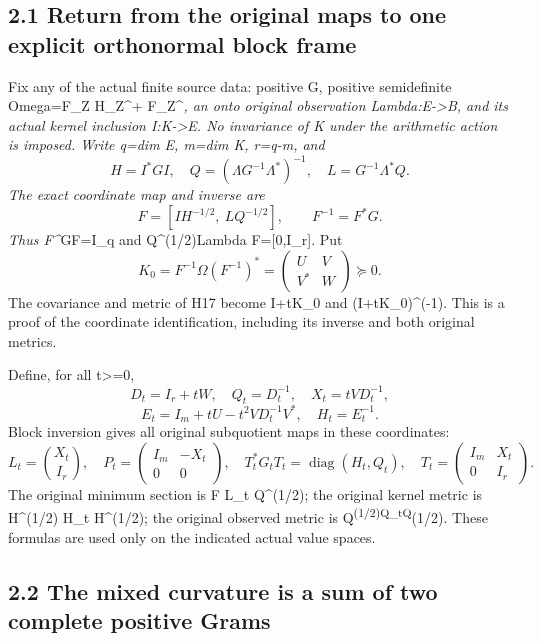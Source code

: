 \subsection{2.1 Return from the original maps to one explicit orthonormal block frame}\label{return-from-the-original-maps-to-one-explicit-orthonormal-block-frame}

Fix any of the actual finite source data: positive G, positive semidefinite Omega=F\_Z H\_Z\^{}+ F\_Z\^{}\emph{, an onto original observation Lambda:E-\textgreater B, and its actual kernel inclusion I:K-\textgreater E. No invariance of K under the arithmetic action is imposed. Write q=dim E, m=dim K, r=q-m, and \[
 H=I^*GI,\quad Q=(\Lambda G^{-1}\Lambda^*)^{-1},\quad
 L=G^{-1}\Lambda^*Q.
\] The exact coordinate map and inverse are \[
 F=[I H^{-1/2},\ L Q^{-1/2}],\qquad F^{-1}=F^*G.
 \tag{M1}
\] Thus F\^{}}GF=I\_q and Q\^{}(1/2)Lambda F={[}0,I\_r{]}. Put \[
 K_0=F^{-1}\Omega(F^{-1})^*
 =\begin{pmatrix}U&V\\V^*&W\end{pmatrix}\succeq0.
 \tag{M2}
\] The covariance and metric of H17 become I+tK\_0 and (I+tK\_0)\^{}(-1). This is a proof of the coordinate identification, including its inverse and both original metrics.

Define, for all t\textgreater=0, \[
 D_t=I_r+tW,\quad Q_t=D_t^{-1},\quad
 X_t=tV D_t^{-1},
\] \[
 E_t=I_m+tU-t^2V D_t^{-1}V^*,\quad H_t=E_t^{-1}.
 \tag{M3}
\] Block inversion gives all original subquotient maps in these coordinates: \[
 \boxed{L_t=\binom{X_t}{I_r},\quad
 P_t=\begin{pmatrix}I_m&-X_t\\0&0\end{pmatrix},\quad
 T_t^*G_tT_t=\operatorname{diag}(H_t,Q_t),\quad
 T_t=\begin{pmatrix}I_m&X_t\\0&I_r\end{pmatrix}.}\tag{M4}
\] The original minimum section is F L\_t Q\^{}(1/2); the original kernel metric is H\^{}(1/2) H\_t H\^{}(1/2); the original observed metric is Q\textsuperscript{(1/2)Q\_tQ}(1/2). These formulas are used only on the indicated actual value spaces.

\subsection{2.2 The mixed curvature is a sum of two complete positive Grams}\label{the-mixed-curvature-is-a-sum-of-two-complete-positive-grams}


